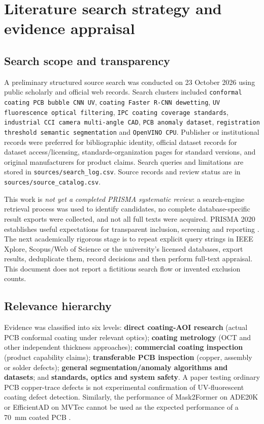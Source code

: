 \section{Literature search strategy and evidence appraisal}
\subsection{Search scope and transparency}
A preliminary structured source search was conducted on 23 October 2026 using public scholarly and official web records. Search clusters included \texttt{conformal coating PCB bubble CNN UV}, \texttt{coating Faster R-CNN dewetting}, \texttt{UV fluorescence optical filtering}, \texttt{IPC coating coverage standards}, \texttt{industrial CCI camera multi-angle CAD}, \texttt{PCB anomaly dataset}, \texttt{registration threshold semantic segmentation} and \texttt{OpenVINO CPU}. Publisher or institutional records were preferred for bibliographic identity, official dataset records for dataset access/licensing, standards-organization pages for standard versions, and original manufacturers for product claims. Search queries and limitations are stored in \texttt{sources/search\_log.csv}. Source records and review status are in \texttt{sources/source\_catalog.csv}.

This work is \emph{not yet a completed PRISMA systematic review}: a search-engine retrieval process was used to identify candidates, no complete database-specific result exports were collected, and not all full texts were acquired. PRISMA 2020 establishes useful expectations for transparent inclusion, screening and reporting \citep{page2021prisma}. The next academically rigorous stage is to repeat explicit query strings in IEEE Xplore, Scopus/Web of Science or the university's licensed databases, export results, deduplicate them, record decisions and then perform full-text appraisal. This document does not report a fictitious search flow or invented exclusion counts.

\subsection{Relevance hierarchy}
Evidence was classified into six levels: \textbf{direct coating-AOI research} (actual PCB conformal coating under relevant optics); \textbf{coating metrology} (OCT and other independent thickness approaches); \textbf{commercial coating inspection} (product capability claims); \textbf{transferable PCB inspection} (copper, assembly or solder defects); \textbf{general segmentation/anomaly algorithms and datasets}; and \textbf{standards, optics and system safety}. A paper testing ordinary PCB copper-trace defects is not experimental confirmation of UV-fluorescent coating defect detection. Similarly, the performance of Mask2Former on ADE20K or EfficientAD on MVTec cannot be used as the expected performance of a 70~mm coated PCB \citep{cheng2022mask2former,batzner2024efficientad,bergmann2019mvtec}.

